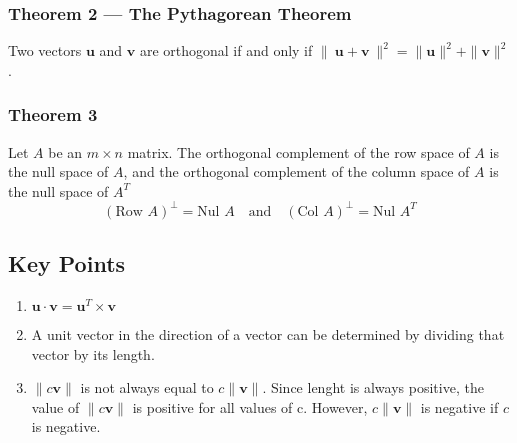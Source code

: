 \documentclass{article}
\begin{document}
\subsubsection*{Theorem 2 --- The Pythagorean Theorem}
Two vectors $\mathbf{u}$ and $\mathbf{v}$ are orthogonal if and only if
$\|\:\mathbf{u}+\mathbf{v}\:\|^2 = \|\mathbf{u}\|^2 + \|\mathbf{v}\|^2$.

\subsubsection*{Theorem 3}
Let $A$ be an $m\times n$ matrix. The orthogonal complement of the row space of $A$ is the null
space of $A$, and the orthogonal complement of the column space of $A$ is the null space of $A^T$
\[{(\text{Row }A)}^\perp = \text{Nul }A\quad\text{and}\quad{(\text{Col }A)}^\perp=\text{Nul }A^T\]

\subsection*{Key Points}
\begin{enumerate}
    \item $\mathbf{u}\cdot\mathbf{v}=\mathbf{u}^T\times \mathbf{v}$
    \item A unit vector in the direction of a vector can be determined by dividing that vector by
    its length.
    \item $\|c\mathbf{v}\|$ is not always equal to $c\|\mathbf{v}\|$. Since lenght is always
    positive, the value of $\|c\mathbf{v}\|$ is positive for all values of c. However,
    $c\|\mathbf{v}\|$ is negative if $c$ is negative.
\end{enumerate}
\end{document}
